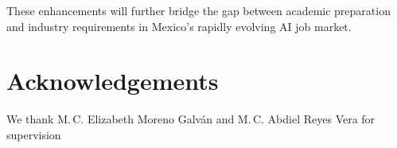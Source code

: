 \documentclass[runningheads]{llncs}
\begin{document}
These enhancements will further bridge the gap between academic preparation and industry requirements in Mexico's rapidly evolving AI job market.
	
	\section*{Acknowledgements}
	We thank M.\,C. Elizabeth Moreno Galván and M.\,C. Abdiel Reyes Vera for supervision
	
\makeatletter
\renewcommand{\@biblabel}[1]{#1.} 
\makeatother



\end{document}
